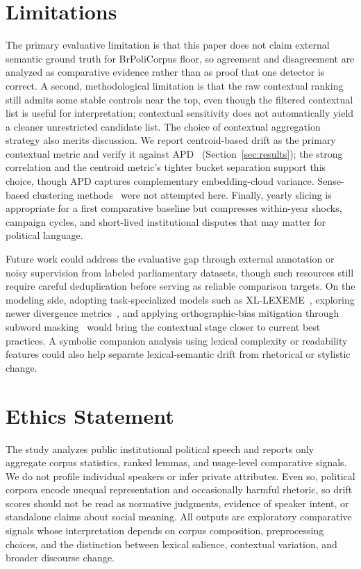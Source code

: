 \documentclass[12pt]{article}
\begin{document}
\section{Limitations}
\label{sec:limitations}

The primary evaluative limitation is that this paper does not claim external
semantic ground truth for BrPoliCorpus floor, so agreement and disagreement are
analyzed as comparative evidence rather than as proof that one detector is
correct. A second, methodological limitation is that the raw contextual ranking
still admits some stable controls near the top, even though the filtered
contextual list is useful for interpretation; contextual sensitivity does not
automatically yield a cleaner unrestricted candidate list. The choice of
contextual aggregation strategy also merits discussion. We report centroid-based
drift as the primary contextual metric and verify it against
APD~\cite{giulianelli-etal-2020-analysing,cassotti-etal-2024-systematic}
(Section~\ref{sec:results}); the strong correlation and the centroid metric's
tighter bucket separation support this choice, though APD captures
complementary embedding-cloud variance. Sense-based clustering
methods~\cite{montariol-etal-2021-scalable} were not attempted here. Finally,
yearly slicing is appropriate for a first comparative baseline but
compresses within-year shocks, campaign cycles, and short-lived institutional
disputes that may matter for political language.

Future work could address the evaluative gap through external annotation
or noisy supervision from labeled parliamentary datasets, though such resources
still require careful deduplication before serving as reliable comparison
targets. On the modeling side, adopting task-specialized
models such as
XL-LEXEME~\cite{cassotti-etal-2024-systematic}, exploring newer divergence
metrics~\cite{rachinskiy-schlechtweg-2025-rethinking}, and applying
orthographic-bias mitigation through subword
masking~\cite{laicher-etal-2021-explaining} would bring the contextual stage
closer to current best practices. A symbolic companion analysis using lexical
complexity or readability features could also help separate lexical-semantic
drift from rhetorical or stylistic change.

\section{Ethics Statement}
\label{sec:ethics}

The study analyzes public institutional political speech and reports only
aggregate corpus statistics, ranked lemmas, and usage-level comparative signals.
We do not profile individual speakers or infer private attributes. Even so,
political corpora encode unequal representation and occasionally harmful
rhetoric, so drift scores should not be read as normative judgments, evidence
of speaker intent, or standalone claims about social meaning. All outputs are
exploratory comparative signals whose interpretation depends on corpus
composition, preprocessing choices, and the distinction between lexical
salience, contextual variation, and broader discourse change.



\end{document}
